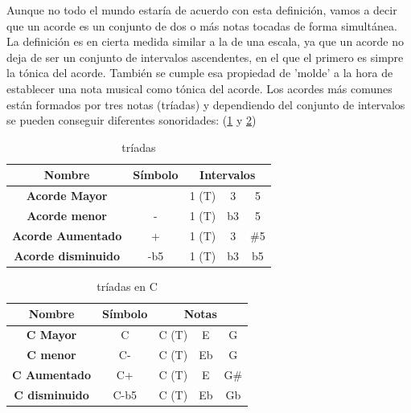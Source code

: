 Aunque no todo el mundo estaría de acuerdo con esta definición, vamos a decir que un acorde es un conjunto de dos o más notas tocadas de forma simultánea. La definición es en cierta medida similar a la de una escala, ya que un acorde no deja de ser un conjunto de intervalos ascendentes, en el que el primero es simpre la tónica del acorde. También se cumple esa propiedad de 'molde' a la hora de establecer una nota musical como tónica del acorde. Los acordes más comunes están formados por tres notas (tríadas) y dependiendo del conjunto de intervalos se pueden conseguir diferentes sonoridades: (\ref{tab:triads} y \ref{tab:triadsC})

\begin{table}[h]
    \centering
    \begin{tabular}{c|c|c|c|c}       
        \textbf{Nombre} & \textbf{Símbolo} & \multicolumn{3}{c}{\textbf{Intervalos}} \\
        \hline
        \hline
        \textbf{Acorde Mayor} & & 1 (T) & 3 & 5 \\
        \hline
        \textbf{Acorde menor} & - & 1 (T) & b3 & 5 \\
        \hline
        \textbf{Acorde Aumentado} & + & 1 (T) & 3 & \#5 \\
        \hline
        \textbf{Acorde disminuido} & -b5 & 1 (T) & b3 & b5 \\
    \end{tabular}
    \caption{tríadas}
    \label{tab:triads}
\end{table}

\begin{table}[h]
    \centering
    \begin{tabular}{c|c|c|c|c}       
        \textbf{Nombre} & \textbf{Símbolo} & \multicolumn{3}{c}{\textbf{Notas}} \\
        \hline
        \hline
        \textbf{C Mayor} & C & C (T) & E & G \\
        \hline
        \textbf{C menor} & C- & C (T) & Eb & G \\
        \hline
        \textbf{C Aumentado} & C+ & C (T) & E & G\# \\
        \hline
        \textbf{C disminuido} & C-b5 & C (T) & Eb & Gb \\
    \end{tabular}
    \caption{tríadas en C}
    \label{tab:triadsC}
\end{table}

